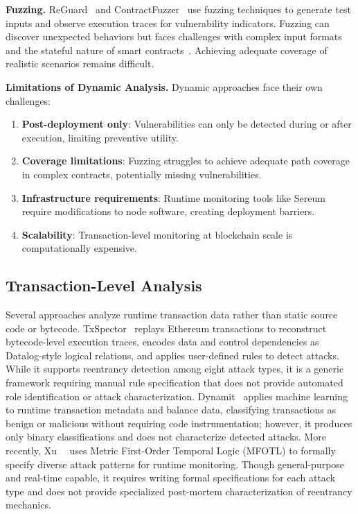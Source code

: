 \textbf{Fuzzing.} ReGuard~\cite{reguard} and ContractFuzzer~\cite{contractfuzzer} use fuzzing techniques to generate test inputs and observe execution traces for vulnerability indicators. Fuzzing can discover unexpected behaviors but faces challenges with complex input formats and the stateful nature of smart contracts~\cite{fuzzing-review}. Achieving adequate coverage of realistic scenarios remains difficult.

\textbf{Limitations of Dynamic Analysis.} Dynamic approaches face their own challenges:

\begin{enumerate}
    \item \textbf{Post-deployment only}: Vulnerabilities can only be detected during or after execution, limiting preventive utility.

    \item \textbf{Coverage limitations}: Fuzzing struggles to achieve adequate path coverage in complex contracts, potentially missing vulnerabilities.

    \item \textbf{Infrastructure requirements}: Runtime monitoring tools like Sereum require modifications to node software, creating deployment barriers.

    \item \textbf{Scalability}: Transaction-level monitoring at blockchain scale is computationally expensive.
\end{enumerate}

\subsection{Transaction-Level Analysis}
\label{sec:rw-transaction}

Several approaches analyze runtime transaction data rather than static source code or bytecode. TxSpector~\cite{txspector} replays Ethereum transactions to reconstruct bytecode-level execution traces, encodes data and control dependencies as Datalog-style logical relations, and applies user-defined rules to detect attacks. While it supports reentrancy detection among eight attack types, it is a generic framework requiring manual rule specification that does not provide automated role identification or attack characterization. Dynamit~\cite{dynamit} applies machine learning to runtime transaction metadata and balance data, classifying transactions as benign or malicious without requiring code instrumentation; however, it produces only binary classifications and does not characterize detected attacks. More recently, Xu~\etal~\cite{moe} uses Metric First-Order Temporal Logic (MFOTL) to formally specify diverse attack patterns for runtime monitoring. Though general-purpose and real-time capable, it requires writing formal specifications for each attack type and does not provide specialized post-mortem characterization of reentrancy mechanics.

